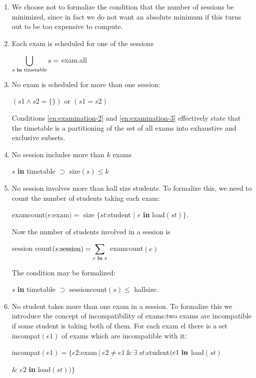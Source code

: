 \documentclass[twoside,11pt]{book}
\begin{document}
\begin{enumerate}[wide, nosep, label=(\arabic*)]
	\item \label{en:examination-1}
	We choose not to formalize the condition that the number of sessions be minimized, since in fact we do not want an absolute minimum if this turns out to be too expensive to compute.

	\item \label{en:examination-2}
	Each exam is scheduled for one of the sessions

	$\displaystyle\bigcup_{s\text{ \textbf{in} timetable}} s =$ exam.all
	\smallskip

	\item \label{en:examination-3}
	No exam is scheduled for more than one session:

	\quad $(s1 \wedge s2 = \{\})$ or $(s1 = s2)$

	\noindent
	Conditions \ref{en:examination-2} and \ref{en:examination-3} effectively state that the timetable is a partitioning of the set of all exams into exhaustive and exclusive subsets.

	\item \label{en:examination-4}
	No session includes more than $k$ exams

	\quad $s$ \textbf{in} timetable $\supset$ size$(s) \leqslant k$

	\item \label{en:examination-5}
	No session involves more than hall size students. To formalize this, we need to count the number of students taking each exam:
	
	\quad examcount$(e$:$\text{exam}) = $ size $\{st$:student $\mid$ $e$ \textbf{in} load$(st)\}$.
	
	Now the number of students involved in a session is
	
	\quad session count$(s\text{:session}) = \displaystyle\sum_{e \text{ \textbf{in} } s}$ examcount$(e)$
	
	The condition may be formalized:
	
	\quad $s$ \textbf{in} timetable $\supset$ sessioncount$(s) \leqslant$ hallsize.
	
	\item \label{en:examination-6}
	No student takes more than one exam in a session. To formalize this we introduce the concept of incompatibility of exams:two exams are incompatible if some student is taking both of them. For each exam el there is a set incompat$(e1)$ of exams which are incompatible with it:
	
	\quad incompat$(e1)= \{e2\text{:exam}\ |\ e2 \neq e1\ \&\ \exists\ st$:student$(e1 \text{ \textbf{in}}$ load$(st)$
		
	\tabto*{8.2em} \& $e2$ \textbf{in} load$(st))\}$
\end{enumerate}
\end{document}
